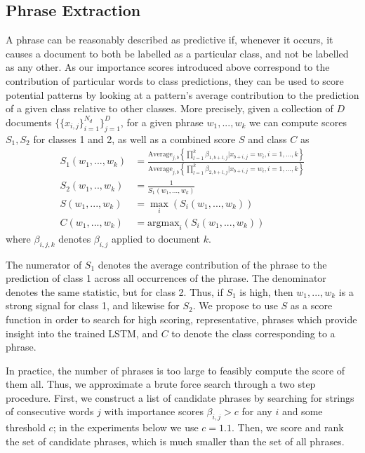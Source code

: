 \documentclass{article}
\begin{document}
\subsection{Phrase Extraction}
\label{sec:phrase_extraction}
A phrase can be reasonably described as predictive if, whenever it occurs, it causes a document to both be labelled as a particular class, and not be labelled as any other. As our importance scores introduced above correspond to the contribution of particular words to class predictions, they can be used to score potential patterns by looking at a pattern's average contribution to the prediction of a given class relative to other classes. More precisely, given a collection of $D$ documents $\{\{x_{i,j}\}_{i = 1}^ {N_d} \}_{j=1}^D$, for a given phrase $w_1,...,w_k$ we can compute scores $S_1, S_2$ for classes 1 and 2, as well as a combined score $S$ and class $C$ as
\begin{align}
S_1(w_1,...,w_k) & =  \frac{\text{Average}_{j,b}\left\lbrace \prod_{l=1}^k \beta_{1, b + l, j} | x_{b + i, j} = w_i, i = 1,...,k  \right\rbrace}{\text{Average}_{j,b}\left\lbrace \prod_{l=1}^k \beta_{2, b + l, j} | x_{b + i, j} = w_i, i = 1,...,k  \right\rbrace} \\
S_2(w_1,..,w_k) & = \frac{1}{S_1(w_1,...,w_k)} \\
S(w_1,...,w_k) & = \max_i(S_i(w_1,...,w_k))\\
C(w_1,...,w_k) & = \text{argmax}_i(S_i(w_1,...,w_k))
\end{align}
where $\beta_{i, j, k}$ denotes $\beta_{i, j}$ applied to document $k$. 

The numerator of $S_1$ denotes the average contribution of the phrase to the prediction of class 1 across all occurrences of the phrase. The denominator denotes the same statistic, but for class 2. Thus, if $S_1$ is high, then $w_1,...,w_k$ is a strong signal for class 1, and likewise for $S_2$. We propose to use $S$ as a score function in order to search for high scoring, representative, phrases which provide insight into the trained LSTM, and $C$ to denote the class corresponding to a phrase.

In practice, the number of phrases is too large to feasibly compute the score of them all. Thus, we approximate a brute force search through a two step procedure. First, we construct a list of candidate phrases by searching for strings of consecutive words $j$ with importance scores $\beta_{i,j} > c$ for any $i$ and some threshold $c$; in the experiments below we use $c=1.1$. Then, we score and rank the set of candidate phrases, which is much smaller than the set of all phrases. 
\end{document}
